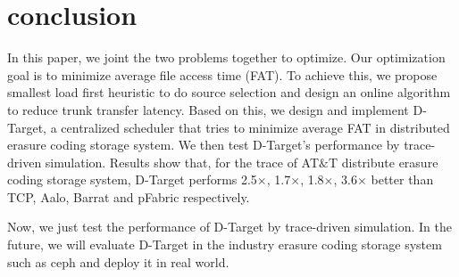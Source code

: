 \documentclass{IEEEtran}
\begin{document}
\section{conclusion} \label{conclusion}

In this paper, we joint the two problems together to optimize.
Our optimization goal is to minimize average file access time (FAT).
To achieve this, we propose smallest load first heuristic to do source selection and design an online algorithm to reduce trunk transfer latency.
Based on this, we design and implement D-Target, a centralized scheduler that tries to minimize average FAT in distributed erasure coding storage system.
We then test D-Target's performance by trace-driven simulation.
Results show that, for the trace of AT$\&$T distribute erasure coding storage system,  D-Target performs 2.5$\times$, 1.7$\times$, 1.8$\times$, 3.6$\times$ better than TCP, Aalo, Barrat and pFabric respectively.

Now, we just test the performance of D-Target by trace-driven simulation. 
In the future, we will evaluate D-Target in the industry erasure coding storage system such as ceph \cite{Ceph
}and deploy it in real world.








\end{document}
